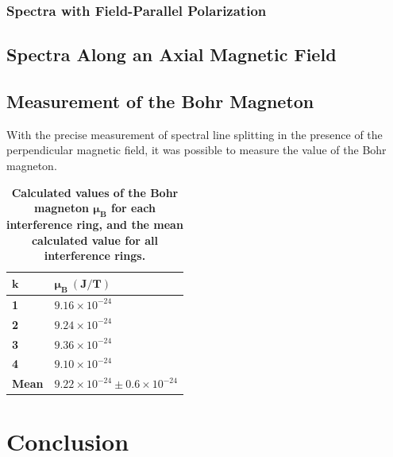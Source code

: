 \documentclass[twocolumn]{article}
\begin{document}
		\subsubsection{Spectra with Field-Parallel Polarization}
	
	\subsection{Spectra Along an Axial Magnetic Field}
	
	\subsection{Measurement of the Bohr Magneton} \label{subsec:BohrMagneton}
		With the precise measurement of spectral line splitting in the presence of the perpendicular magnetic field, it was possible to measure the value of the Bohr magneton.
		
		\begin{table}[]
			\centering
			\begin{tabular}{l|l}
				$\mathbf{k}$    & $\mathbf{\mu_B \ (J/T)}$ \\ \hline
				\textbf{1}    & $9.16\times10^{-24}$   \\
				\textbf{2}    & $9.24\times10^{-24}$   \\
				\textbf{3}    & $9.36\times10^{-24}$   \\
				\textbf{4}    & $9.10\times10^{-24}$   \\ \hline
				\textbf{Mean} & $9.22\times10^{-24}\pm0.6\times10^{-24}$  
			\end{tabular}
			\caption{\textbf{Calculated values of the Bohr magneton $\mathbf{\mu_B}$ for each interference ring, and the mean calculated value for all interference rings.}}
			\label{tab:BohrCalcs}
		\end{table}
	

\section{Conclusion} \label{sec:Conclusion}
\end{document}
